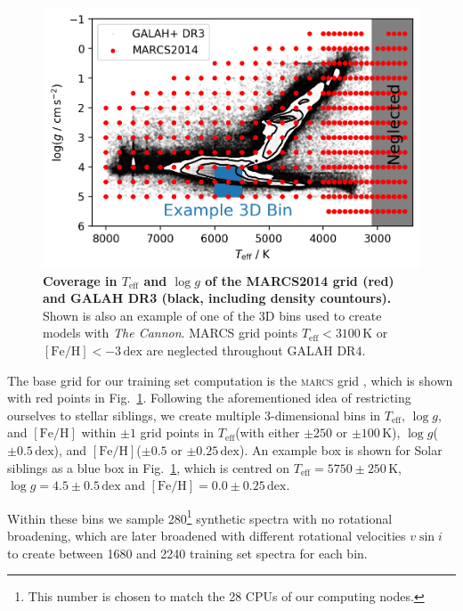 \documentclass[
  journal=pasa,
  manuscript=research-paper, %
  year=2023,
  volume=37
]{cup-journal}
\newcommand{\Teff}{$T_\mathrm{eff}$\xspace}
\newcommand{\logg}{$\log g$\xspace}
\newcommand{\feh}{$\mathrm{[Fe/H]}$\xspace}
\newcommand{\vsini}{$v \sin i$\xspace}
\newcommand{\TheCannon}{\textit{The Cannon}\xspace}
\newcommand{\marcs}{\textsc{marcs}\xspace}
\newcommand{\dex}{\,\mathrm{dex}}	%
\newcommand{\K}{\,\mathrm{K}}	%
\begin{document}
\begin{figure}[ht]
 \centering
 \includegraphics[width=\textwidth]{figures/teff_logg_grid_coverage.png}
 \caption{\textbf{Coverage in \Teff and \logg of the MARCS2014 grid (red) and GALAH DR3 (black, including density countours).} Shown is also an example of one of the 3D bins used to create models with \TheCannon. MARCS grid points \Teff$ < 3100\K$ or \feh$<-3\dex$ are neglected throughout GALAH DR4.}
 \label{fig:teff_logg_grid_coverage}
\end{figure}

The base grid for our training set computation is the \marcs grid \citep{Gustafsson2008}, which is shown with red points in Fig.~\ref{fig:teff_logg_grid_coverage}. Following the aforementioned idea of restricting ourselves to stellar siblings, we create multiple 3-dimensional bins in \Teff, \logg, and \feh within $\pm 1$ grid points in \Teff (with either $\pm 250$ or $\pm 100\K$), \logg ($\pm 0.5\dex$), and \feh ($\pm 0.5$ or $\pm 0.25\dex $). An example box is shown for Solar siblings as a blue box in Fig.~\ref{fig:teff_logg_grid_coverage}, which is centred on $T_\text{eff} = 5750\pm250\K$, $\log g = 4.5\pm0.5\dex$ and $\mathrm{[Fe/H]} = 0.0\pm0.25\dex$.

Within these bins we sample 280\footnote{This number is chosen to match the 28 CPUs of our computing nodes.} synthetic spectra with no rotational broadening, which are later broadened with different rotational velocities \vsini to create between 1680 and 2240 training set spectra for each bin. 
\end{document}
